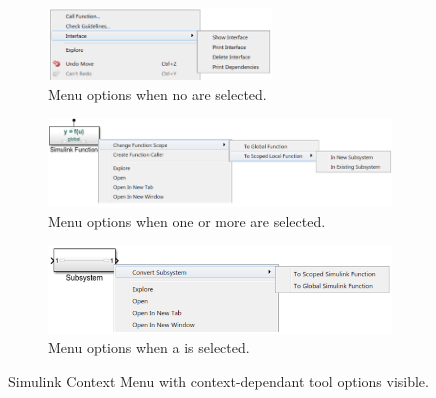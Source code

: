\documentclass{article}
\begin{document}
\begin{figure}[!htb]
    \centering
    \begin{subfigure}[b]{\textwidth}
    \centering
    	\includegraphics[width=0.65\textwidth]{../figs/ContextMenu1}
        \caption{Menu options when no  are selected.}
        \label{FIG:none_selected}
    \end{subfigure}
    
		\vspace{1em}%
		
    \begin{subfigure}[b]{\textwidth}
    \centering
			\includegraphics[width=\textwidth]{../figs/ContextMenu2}
        \caption{Menu options when one or more  are selected.}
        \label{FIG:simfunc_selected}
    \end{subfigure}
    
    		\vspace{1em}%
		
    \begin{subfigure}[b]{\textwidth}
    \centering
			\includegraphics[width=.85\textwidth]{../figs/ContextMenu3}
        \caption{Menu options when a \subsystem is selected.}
        \label{FIG:subsystem_selected}
    \end{subfigure}
    
	\caption{Simulink Context Menu with context-dependant tool options visible.}
	\label{FIG:contextMenu}
\end{figure}

\newpage
\end{document}
